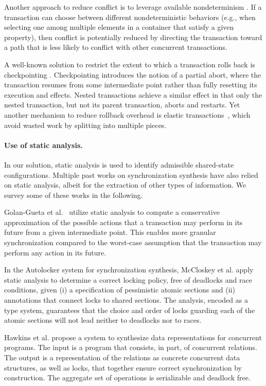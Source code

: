 Another approach to reduce conflict is to leverage available nondeterminism \cite{TKS:OOPSLA13}. If a transaction can choose between different nondeterministic behaviors (e.g., when selecting one among multiple elements in a container that satisfy a given property), then conflict is potentially reduced by directing the transaction toward a path that is less likely to conflict with other concurrent transactions.

A well-known solution to restrict the extent to which a transaction rolls back is checkpointing \cite{spaa08a,XXX}. Checkpointing introduces the notion of a partial abort, where the transaction resumes from some intermediate point rather than fully resetting its execution and effects. Nested transactions \cite{ont,beeri} achieve a similar effect in that only the nested transaction, but not its parent transaction, aborts and restarts. Yet another mechanism to reduce rollback overhead is elastic transactions~\cite{FGG:DISC09}, which avoid wasted work by splitting into multiple pieces.  

\paragraph{Use of static analysis.} In our solution, static analysis is used to identify admissible shared-state configurations. Multiple past works on synchronization synthesis have also relied on static analysis, albeit for the extraction of other types of information. We survey some of these works in the following.

Golan-Gueta et al.~\cite{GRSY:PLDI13} utilize static analysis to compute a conservative approximation of the possible actions that a transaction may perform in its future from a given intermediate point. This enables more granular synchronization compared to the worst-case assumption that the transaction may perform any action in its future.

In the Autolocker system for synchronization synthesis, McCloskey et al. \cite{POPL'05} apply static analysis to determine a correct locking policy, free of deadlocks and race conditions, given (i) a specification of pessimistic atomic sections and (ii) annotations that connect locks to shared sections. The analysis, encoded as a type system, guarantees that the choice and order of locks guarding each of the atomic sections will not lead neither to deadlocks nor to races.

Hawkins et al. \cite{HawkinsPLDI13} propose a system to synthesize data representations for concurrent programs. The input is a program that consists, in part, of concurrent relations. The output is a representation of the relations as concrete concurrent data structures, as well as locks, that together ensure correct synchronization by construction. The aggregate set of operations is serializable and deadlock free.


